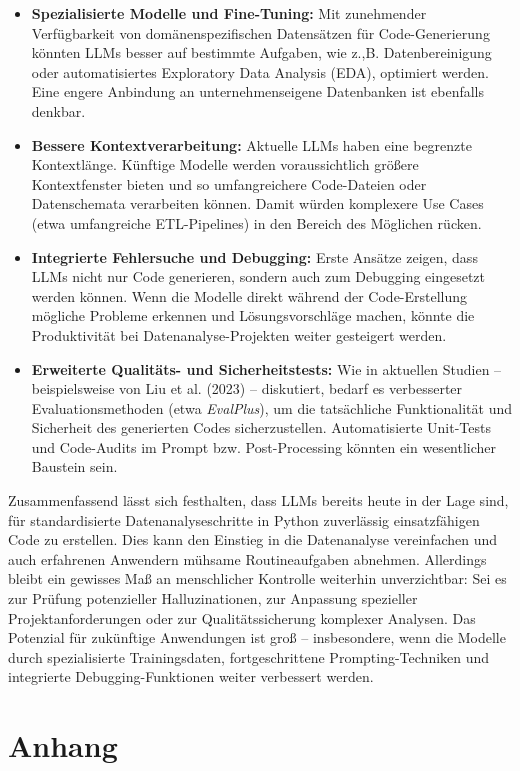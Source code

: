 \documentclass[11pt,a4paper]{article}
\begin{document}
\begin{itemize} \item \textbf{Spezialisierte Modelle und Fine-Tuning:}
Mit zunehmender Verfügbarkeit von domänenspezifischen Datensätzen für Code-Generierung könnten LLMs besser auf bestimmte Aufgaben, wie z.,B. Datenbereinigung oder automatisiertes Exploratory Data Analysis (EDA), optimiert werden. Eine engere Anbindung an unternehmenseigene Datenbanken ist ebenfalls denkbar. \item \textbf{Bessere Kontextverarbeitung:}
Aktuelle LLMs haben eine begrenzte Kontextlänge. Künftige Modelle werden voraussichtlich größere Kontextfenster bieten und so umfangreichere Code-Dateien oder Datenschemata verarbeiten können. Damit würden komplexere Use Cases (etwa umfangreiche ETL-Pipelines) in den Bereich des Möglichen rücken. \item \textbf{Integrierte Fehlersuche und Debugging:}
Erste Ansätze zeigen, dass LLMs nicht nur Code generieren, sondern auch zum Debugging eingesetzt werden können. Wenn die Modelle direkt während der Code-Erstellung mögliche Probleme erkennen und Lösungsvorschläge machen, könnte die Produktivität bei Datenanalyse-Projekten weiter gesteigert werden. \item \textbf{Erweiterte Qualitäts- und Sicherheitstests:}
Wie in aktuellen Studien – beispielsweise von Liu et al. (2023) – diskutiert, bedarf es verbesserter Evaluationsmethoden (etwa \emph{EvalPlus}), um die tatsächliche Funktionalität und Sicherheit des generierten Codes sicherzustellen. Automatisierte Unit-Tests und Code-Audits im Prompt bzw. Post-Processing könnten ein wesentlicher Baustein sein. \end{itemize}

\noindent Zusammenfassend lässt sich festhalten, dass LLMs bereits heute in der Lage sind, für standardisierte Datenanalyseschritte in Python zuverlässig einsatzfähigen Code zu erstellen. Dies kann den Einstieg in die Datenanalyse vereinfachen und auch erfahrenen Anwendern mühsame Routineaufgaben abnehmen. Allerdings bleibt ein gewisses Maß an menschlicher Kontrolle weiterhin unverzichtbar: Sei es zur Prüfung potenzieller Halluzinationen, zur Anpassung spezieller Projektanforderungen oder zur Qualitätssicherung komplexer Analysen. Das Potenzial für zukünftige Anwendungen ist groß – insbesondere, wenn die Modelle durch spezialisierte Trainingsdaten, fortgeschrittene Prompting-Techniken und integrierte Debugging-Funktionen weiter verbessert werden.

\newpage
\section{Anhang}
\label{sec:anhang}
\end{document}
